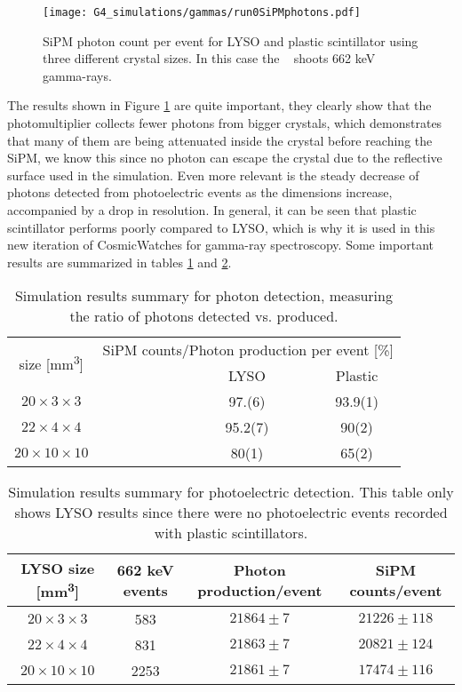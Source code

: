 \begin{figure}
  \centering
  \texttt{[image: G4\_simulations/gammas/run0SiPMphotons.pdf]}
  \caption{\label{fig:LYSO_SiPMPhotons}SiPM photon count per event for LYSO and plastic scintillator using three different crystal sizes. In this case the \gps~ shoots 662 \unit{\kilo\eV} gamma-rays.}
\end{figure}

The results shown in Figure \ref{fig:LYSO_SiPMPhotons} are quite important, they clearly show that the photomultiplier collects fewer photons from bigger crystals, which demonstrates that many of them are being attenuated inside the crystal before reaching the SiPM, we know this since no photon can escape the crystal due to the reflective surface used in the simulation. Even more relevant is the steady decrease of photons detected from photoelectric events as the dimensions increase, accompanied by a drop in resolution. In general, it can be seen that plastic scintillator performs poorly compared to LYSO, which is why it is used in this new iteration of CosmicWatches for gamma-ray spectroscopy. Some important results are summarized in tables \ref{tab:sim_results_detection_percentage} and \ref{tab:sim_results_photoelectric_efficiency}.

\begin{table}[H]
  \caption{Simulation results summary for photon detection, measuring the ratio of photons detected vs. produced.}
  \centering
  \begin{tabular}{ c c c }
    \midrule
    \multirow{2}{*}{size [\unit{\mm\cubed}]} & \multicolumn{2}{c}{SiPM counts/Photon production per event [\%]} \\
    & ~~~~~~~~~~~~LYSO & Plastic \\
    \midrule
    $20\times3\times3$ & ~~~~~~~~~~~~97.(6) & 93.9(1) \\
    $22\times4\times4$ & ~~~~~~~~~~~~95.2(7) & 90(2) \\
    $20\times10\times10$ & ~~~~~~~~~~~~80(1) & 65(2) \\
    \bottomrule
  \end{tabular}
  \label{tab:sim_results_detection_percentage}
\end{table}

\begin{table}[H]
  \caption{Simulation results summary for photoelectric detection. This table only shows LYSO results since there were no photoelectric events recorded with plastic scintillators.}
  \centering
  \begin{tabular}{ c c c c}
    \midrule
    LYSO size [\unit{\mm\cubed}] & 662 \unit{\kilo\eV} events & Photon production/event & SiPM counts/event \\
    \midrule
    $20\times3\times3$ & 583 & $21864\pm 7$ & $21226\pm 118$ \\
    $22\times4\times4$ & 831 & $21863\pm 7$ & $20821\pm 124$ \\
    $20\times10\times10$ & 2253 & $21861\pm 7$ & $17474\pm 116$ \\
    \bottomrule
  \end{tabular}
  \label{tab:sim_results_photoelectric_efficiency}
\end{table}